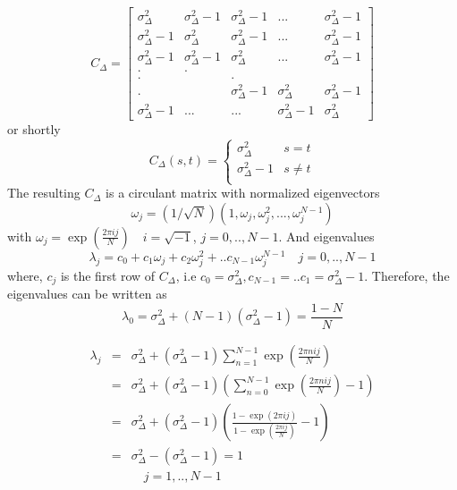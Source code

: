\documentclass{report}
\begin{document}
\begin{equation*}
C_\Delta = \left[
\begin{matrix}
\sigma^2_{\Delta}     & \sigma^2_{\Delta}-1 & \sigma^2_{\Delta}-1 & ...                 & \sigma^2_{\Delta}-1 \\
\sigma^2_{\Delta}-1   &\sigma^2_{\Delta}    & \sigma^2_{\Delta}-1 & ...                 & \sigma^2_{\Delta}-1 \\
\sigma^2_{\Delta}-1   & \sigma^2_{\Delta}-1 & \sigma^2_{\Delta}   & ...                 & \sigma^2_{\Delta}-1 \\
.                     &    .                &                     &                     &      \\
.                     &                     &  .                  &                     &      \\
.                     &                     & \sigma^2_{\Delta}-1 & \sigma^2_{\Delta}   & \sigma^2_{\Delta}-1  \\
\sigma^2_{\Delta}-1   & ...                 &...                  & \sigma^2_{\Delta}-1 & \sigma^2_{\Delta}
\end{matrix}
\right]
\end{equation*}
or shortly 
\begin{equation*}
C_\Delta(s,t)=
\begin{cases}
\sigma^2_\Delta & s=t\\
\sigma^2_\Delta-1 & s\neq t\\
\end{cases}
\end{equation*}
The resulting $C_\Delta$ is a circulant matrix with normalized eigenvectors
\begin{equation*}
\omega_j = (1/\sqrt{N})(1,\omega_j,\omega_j^2,...,\omega_j^{N-1})
\end{equation*}
with $\omega_j = \exp(\frac{2\pi ij}{N}) \quad i=\sqrt{-1}$, $j=0,..,N-1$. And eigenvalues
\begin{equation*}
\lambda_j = c_0 +c_1\omega_j +c_2\omega_j^2 +..c_{N-1}\omega_j^{N-1} \quad j=0,..,N-1
\end{equation*}
where, $c_j$ is the first row of $C_\Delta$, i.e $c_0=\sigma^2_{\Delta} , c_{N-1}=..c_1=\sigma^2_{\Delta} -1$. Therefore, the eigenvalues can be written as 
\begin{equation*}
\lambda_0 =  \sigma^2_{\Delta}+(N-1)( \sigma^2_{\Delta}-1)=\frac{1-N}{N}
\end{equation*}

\begin{eqnarray*}
\lambda_j & = & \sigma^2_{\Delta} +(\sigma^2_{\Delta}-1)\sum_{n=1}^{N-1}\exp(\frac{2\pi nij}{N})\\
& = & \sigma^2_{\Delta} +(\sigma^2_{\Delta}-1)\left(\sum_{n=0}^{N-1}\exp(\frac{2\pi nij}{N})-1 \right)\\
 & = &  \sigma^2_{\Delta} +(\sigma^2_{\Delta}-1)\left(\frac{1-\exp(2\pi ij)}{1-\exp(\frac{2\pi ij}{N})}-1 \right)\\
  & =&  \sigma^2_{\Delta} -(\sigma^2_{\Delta}-1) = 1 \\
  && \quad j=1,..,N-1
\end{eqnarray*}
\end{document}
